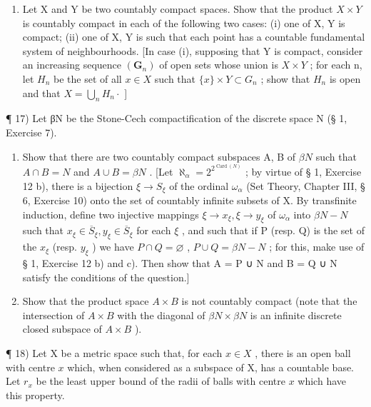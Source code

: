 \begin{enumerate}
\def\labelenumi{\arabic{enumi})}
\setcounter{enumi}{15}
\tightlist
\item
  Let X and Y be two countably compact spaces. Show that the product \(X \times Y\) is countably compact in each of the following two cases: (i) one of X, Y is compact; (ii) one of X, Y is such that each point has a countable fundamental system of neighbourhoods. {[}In case (i), supposing that Y is compact, consider an increasing sequence \((\mathbf{G}_{n})\) of open sets whose union is \(X \times Y\) ; for each n, let \(H_{n}\) be the set of all \(x \in X\) such that \(\{x\} \times Y \subset G_{n}\) ; show that \(H_{n}\) is open and that \(X = \bigcup_{n} H_{n} \cdot\) {]}
\end{enumerate}

¶ 17) Let βN be the Stone-Cech compactification of the discrete space N (§ 1, Exercise 7).

\begin{enumerate}
\def\labelenumi{\alph{enumi})}
\item
  Show that there are two countably compact subspaces A, B of \(\beta N\) such that \(A \cap B = N\) and \(A \cup B = \beta N\) . {[}Let \(\aleph_{\alpha} = 2^{2^{\operatorname{Card}(N)}}\) ; by virtue of § 1, Exercise 12 b), there is a bijection \(\xi \to S_{\xi}\) of the ordinal \(\omega_{\alpha}\) (Set Theory, Chapter III, § 6, Exercise 10) onto the set of countably infinite subsets of X. By transfinite induction, define two injective mappings \(\xi \to x_{\xi}, \xi \to y_{\xi}\) of \(\omega_{\alpha}\) into \(\beta N - N\) such that \(x_{\xi} \in \overline{S}_{\xi}, y_{\xi} \in \overline{S}_{\xi}\) for each \(\xi\) , and such that if P (resp. Q) is the set of the \(x_{\xi}\) (resp. \(y_{\xi}\) ) we have \(P \cap Q = \varnothing\) , \(P \cup Q = \beta N - N\) ; for this, make use of § 1, Exercise 12 b) and c). Then show that A = P ∪ N and B = Q ∪ N satisfy the conditions of the question.{]}
\item
  Show that the product space \(A \times B\) is not countably compact (note that the intersection of \(A \times B\) with the diagonal of \(\beta N \times \beta N\) is an infinite discrete closed subspace of \(A \times B\) ).
\end{enumerate}

¶ 18) Let X be a metric space such that, for each \(x \in X\) , there is an open ball with centre \(x\) which, when considered as a subspace of X, has a countable base. Let \(r_x\) be the least upper bound of the radii of balls with centre \(x\) which have this property.

